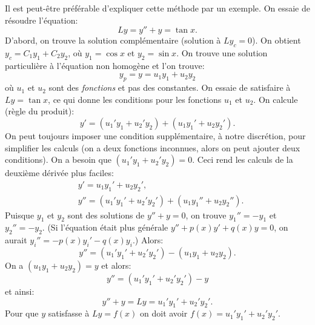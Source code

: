 Il est peut-être préférable d'expliquer cette méthode par un exemple. 
On essaie de résoudre l'équation:  
\begin{equation*}
	Ly = y''+y = \tan x .
\end{equation*}
D'abord, on trouve la solution complémentaire (solution à $Ly_c = 0$).  
On obtient $y_c = C_1 y_1 + C_2 y_2$, où $y_1 = \cos x$ et $y_2 = \sin x$.
On trouve une solution particulière à l'équation non homogène et l'on trouve: 
\begin{equation*}
	y_p = y = u_1 y_1 + u_2 y_2 
\end{equation*}
où $u_1$ et $u_2$ sont des \emph{fonctions} et pas des constantes.
On essaie de satisfaire à $Ly = \tan x$, ce qui donne les conditions pour les fonctions  $u_1$ et $u_2$.
On calcule (règle du produit):  
\begin{equation*}
	y' = (u_1' y_1 + u_2' y_2) + (u_1 y_1' + u_2 y_2').
\end{equation*}
On peut toujours imposer une condition supplémentaire, à notre discrétion, pour simplifier les calculs (on a deux fonctions inconnues, alors on peut ajouter deux conditions). On a besoin que 
$(u_1' y_1 + u_2' y_2) = 0$.  Ceci rend les calculs de la deuxième dérivée plus faciles: 
\begin{align*}
	& y' = u_1 y_1' + u_2 y_2' , \\
	& y'' = (u_1' y_1' + u_2' y_2') + (u_1 y_1'' + u_2 y_2'') .
\end{align*}
Puisque $y_1$ et $y_2$ sont des solutions de $y''+y = 0$, on trouve 
$y_1'' = - y_1$ et $y_2'' = - y_2$.
(Si l'équation était plus générale  $y''+p(x)y' +q(x)y = 0$, on aurait $y_i'' = -p(x)y_i' -q(x)y_i$.) 
Alors: 
\begin{equation*}
	y'' = (u_1' y_1' + u_2' y_2') - (u_1 y_1 + u_2 y_2) .
\end{equation*}
On a $(u_1 y_1 + u_2 y_2) = y$ et alors:
\begin{equation*}
	y'' = (u_1' y_1' + u_2' y_2') - y 
\end{equation*}
et ainsi: 
\begin{equation*}
	y'' + y = Ly = u_1' y_1' + u_2' y_2' .
\end{equation*}
Pour  que $y$ satisfasse à $Ly = f(x)$ on doit avoir
$f(x) = u_1' y_1' + u_2' y_2'$.

